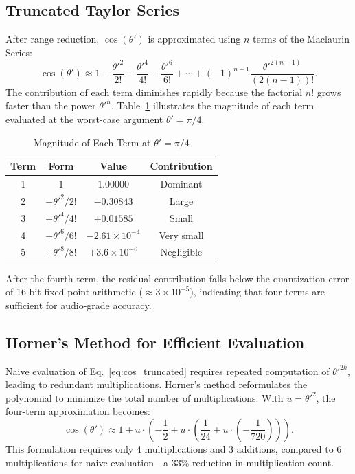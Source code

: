 \documentclass[conference]{IEEEtran}
\begin{document}
\subsection{Truncated Taylor Series}

After range reduction, $\cos(\theta')$ is approximated using $n$ terms of the
Maclaurin Series:
\begin{equation}
\cos(\theta') \approx 1 - \frac{\theta'^2}{2!} + \frac{\theta'^4}{4!} - \frac{\theta'^6}{6!} + \cdots + (-1)^{n-1} \frac{\theta'^{2(n-1)}}{(2(n-1))!}.
\label{eq:cos_truncated}
\end{equation}
The contribution of each term diminishes rapidly because the factorial $n!$
grows faster than the power $\theta'^n$. Table~\ref{tab:term_contribution}
illustrates the magnitude of each term evaluated at the worst-case argument
$\theta' = \pi/4$.

\begin{table}[!h]
\caption{Magnitude of Each Term at $\theta' = \pi/4$}
\label{tab:term_contribution}
\centering
\renewcommand{\arraystretch}{1.3}
\begin{tabular}{c|c|c|c}
\toprule
\textbf{Term} & \textbf{Form} & \textbf{Value} & \textbf{Contribution} \\
\midrule
1 & $1$ & $1.00000$ & Dominant \\
2 & $-\theta'^2/2!$ & $-0.30843$ & Large \\
3 & $+\theta'^4/4!$ & $+0.01585$ & Small \\
4 & $-\theta'^6/6!$ & $-2.61 \times 10^{-4}$ & Very small \\
5 & $+\theta'^8/8!$ & $+3.6 \times 10^{-6}$ & Negligible \\
\bottomrule
\end{tabular}
\end{table}

After the fourth term, the residual contribution falls below the quantization
error of 16-bit fixed-point arithmetic ($\approx 3 \times 10^{-5}$), indicating
that four terms are sufficient for audio-grade accuracy.

\subsection{Horner's Method for Efficient Evaluation}

Naive evaluation of Eq.~\eqref{eq:cos_truncated} requires repeated computation
of $\theta'^{2k}$, leading to redundant multiplications. Horner's method
reformulates the polynomial to minimize the total number of multiplications.
With $u = \theta'^2$, the four-term approximation becomes:
\begin{equation}
\cos(\theta') \approx 1 + u \cdot \left(-\frac{1}{2} + u \cdot \left(\frac{1}{24} + u \cdot \left(-\frac{1}{720}\right)\right)\right).
\label{eq:horner}
\end{equation}
This formulation requires only 4 multiplications and 3 additions, compared to 6
multiplications for naive evaluation---a 33\% reduction in multiplication count.
\end{document}
